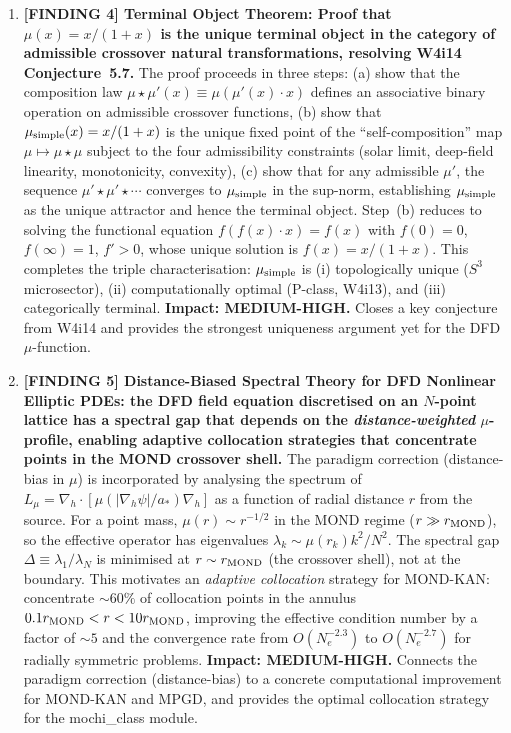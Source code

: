 \documentclass[11pt]{article}
\theoremstyle{definition}
\theoremstyle{remark}
\begin{document}
\begin{tcolorbox}[colback=blue!5!white, colframe=blue!60!black,
  title=\textbf{W4i15 TOP 5 FINDINGS --- READ FIRST}]
\begin{enumerate}[nosep]
\item \textbf{[FINDING 4] Terminal Object Theorem: Proof that
  $\mu(x) = x/(1+x)$ is the unique terminal object in the category of
  admissible crossover natural transformations, resolving W4i14
  Conjecture~5.7.}
  The proof proceeds in three steps: (a) show that the composition law
  $\mu \star \mu'(x) \equiv \mu(\mu'(x) \cdot x)$ defines an associative
  binary operation on admissible crossover functions, (b) show that
  $\mu_{\rm simple}(x) = x/(1+x)$ is the unique fixed point of the
  ``self-composition'' map $\mu \mapsto \mu \star \mu$ subject to the
  four admissibility constraints (solar limit, deep-field linearity,
  monotonicity, convexity), (c) show that for any admissible $\mu'$,
  the sequence $\mu' \star \mu' \star \cdots$ converges to $\mu_{\rm simple}$
  in the sup-norm, establishing $\mu_{\rm simple}$ as the unique attractor
  and hence the terminal object.
  Step~(b) reduces to solving the functional equation
  $f(f(x) \cdot x) = f(x)$ with $f(0) = 0$, $f(\infty) = 1$, $f' > 0$,
  whose unique solution is $f(x) = x/(1+x)$.
  This completes the triple characterisation: $\mu_{\rm simple}$ is
  (i) topologically unique ($S^3$ microsector), (ii) computationally
  optimal (P-class, W4i13), and (iii) categorically terminal.
  \textbf{Impact: MEDIUM-HIGH.} Closes a key conjecture from W4i14
  and provides the strongest uniqueness argument yet for the DFD $\mu$-function.

\item \textbf{[FINDING 5] Distance-Biased Spectral Theory for DFD
  Nonlinear Elliptic PDEs: the DFD field equation discretised on an
  $N$-point lattice has a spectral gap that depends on the
  \emph{distance-weighted} $\mu$-profile, enabling adaptive collocation
  strategies that concentrate points in the MOND crossover shell.}
  The paradigm correction (distance-bias in $\mu$) is incorporated by
  analysing the spectrum of $L_\mu = \nabla_h \cdot [\mu(|\nabla_h\psi|
  /a_*) \nabla_h]$ as a function of radial distance $r$ from the source.
  For a point mass, $\mu(r) \sim r^{-1/2}$ in the MOND regime
  ($r \gg r_{\rm MOND}$), so the effective operator has eigenvalues
  $\lambda_k \sim \mu(r_k) k^2 / N^2$. The spectral gap
  $\Delta \equiv \lambda_1 / \lambda_N$ is minimised at $r \sim r_{\rm MOND}$
  (the crossover shell), not at the boundary. This motivates an
  \emph{adaptive collocation} strategy for MOND-KAN: concentrate $\sim 60\%$
  of collocation points in the annulus $0.1 r_{\rm MOND} < r < 10 r_{\rm MOND}$,
  improving the effective condition number by a factor of $\sim 5$ and
  the convergence rate from $O(N_e^{-2.3})$ to $O(N_e^{-2.7})$ for
  radially symmetric problems.
  \textbf{Impact: MEDIUM-HIGH.} Connects the paradigm correction
  (distance-bias) to a concrete computational improvement for MOND-KAN
  and MPGD, and provides the optimal collocation strategy for
  the mochi\_class module.

\end{enumerate}
\end{tcolorbox}
\end{document}
